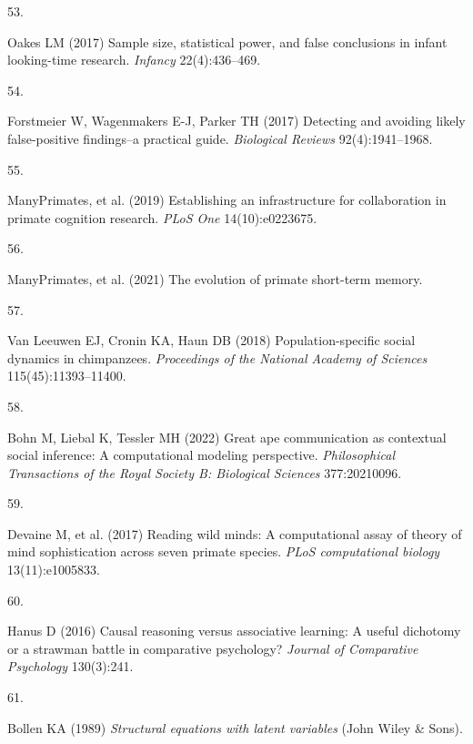\documentclass[
  man,floatsintext]{apa6}
\newlength{\cslhangindent}
\newlength{\csllabelwidth}
\newlength{\cslentryspacingunit} %
\newenvironment{CSLReferences}[2] %
 {%
  \setlength{\parindent}{0pt}
  \ifodd #1
  \let\oldpar\par
  \def\par{\hangindent=\cslhangindent\oldpar}
  \fi
  \setlength{\parskip}{#2\cslentryspacingunit}
 }%
 {}
\newcommand{\CSLLeftMargin}[1]{\parbox[t]{\csllabelwidth}{#1}}
\newcommand{\CSLRightInline}[1]{\parbox[t]{\linewidth - \csllabelwidth}{#1}\break}
\begin{document}
\begin{CSLReferences}{0}{0}
\leavevmode{}%
\CSLLeftMargin{53. }%
\CSLRightInline{Oakes LM (2017) Sample size, statistical power, and false conclusions in infant looking-time research. \emph{Infancy} 22(4):436--469.}

\leavevmode{}%
\CSLLeftMargin{54. }%
\CSLRightInline{Forstmeier W, Wagenmakers E-J, Parker TH (2017) Detecting and avoiding likely false-positive findings--a practical guide. \emph{Biological Reviews} 92(4):1941--1968.}

\leavevmode{}%
\CSLLeftMargin{55. }%
\CSLRightInline{ManyPrimates, et al. (2019) Establishing an infrastructure for collaboration in primate cognition research. \emph{PLoS One} 14(10):e0223675.}

\leavevmode{}%
\CSLLeftMargin{56. }%
\CSLRightInline{ManyPrimates, et al. (2021) The evolution of primate short-term memory.}

\leavevmode{}%
\CSLLeftMargin{57. }%
\CSLRightInline{Van Leeuwen EJ, Cronin KA, Haun DB (2018) Population-specific social dynamics in chimpanzees. \emph{Proceedings of the National Academy of Sciences} 115(45):11393--11400.}

\leavevmode{}%
\CSLLeftMargin{58. }%
\CSLRightInline{Bohn M, Liebal K, Tessler MH (2022) Great ape communication as contextual social inference: A computational modeling perspective. \emph{Philosophical Transactions of the Royal Society B: Biological Sciences} 377:20210096.}

\leavevmode{}%
\CSLLeftMargin{59. }%
\CSLRightInline{Devaine M, et al. (2017) Reading wild minds: A computational assay of theory of mind sophistication across seven primate species. \emph{PLoS computational biology} 13(11):e1005833.}

\leavevmode{}%
\CSLLeftMargin{60. }%
\CSLRightInline{Hanus D (2016) Causal reasoning versus associative learning: A useful dichotomy or a strawman battle in comparative psychology? \emph{Journal of Comparative Psychology} 130(3):241.}

\leavevmode{}%
\CSLLeftMargin{61. }%
\CSLRightInline{Bollen KA (1989) \emph{Structural equations with latent variables} (John Wiley \& Sons).}


\end{CSLReferences}
\end{document}
